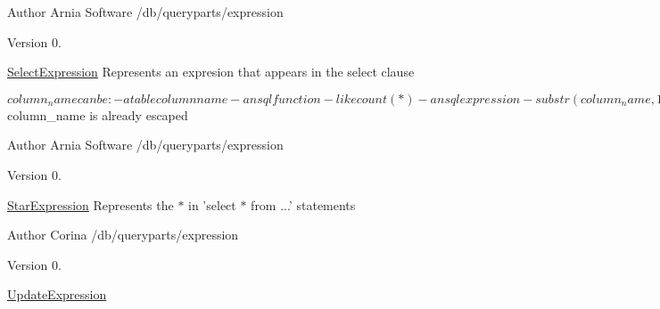 \begin{DoxyAuthor}{Author}
Arnia Software /db/queryparts/expression 
\end{DoxyAuthor}
\begin{DoxyVersion}{Version}
0.
\end{DoxyVersion}
\hyperlink{classSelectExpression}{Select\+Expression} Represents an expresion that appears in the select clause \begin{DoxyVerb}    $column_name can be:
    - a table column name
    - an sql function - like count(*)
        - an sql expression - substr(column_name, 1, 8) or score1 + score2
    $column_name is already escaped
\end{DoxyVerb}


\begin{DoxyAuthor}{Author}
Arnia Software /db/queryparts/expression 
\end{DoxyAuthor}
\begin{DoxyVersion}{Version}
0.
\end{DoxyVersion}
\hyperlink{classStarExpression}{Star\+Expression} Represents the $\ast$ in 'select $\ast$ from ...' statements

\begin{DoxyAuthor}{Author}
Corina /db/queryparts/expression 
\end{DoxyAuthor}
\begin{DoxyVersion}{Version}
0.
\end{DoxyVersion}
\hyperlink{classUpdateExpression}{Update\+Expression}

